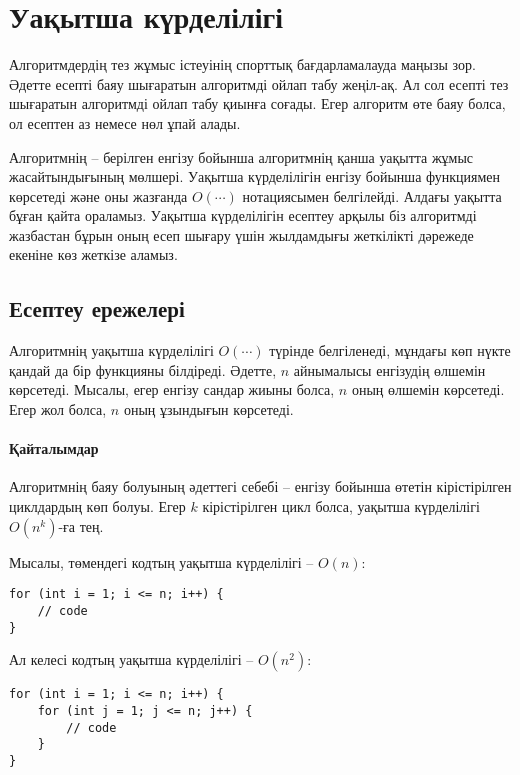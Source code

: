 \chapter{Уақытша күрделілігі}


Алгоритмдердің тез жұмыс істеуінің спорттық бағдарламалауда маңызы зор.
Әдетте есепті баяу шығаратын алгоритмді ойлап табу жеңіл-ақ.
Ал сол есепті тез шығаратын алгоритмді ойлап табу қиынға соғады.
Егер алгоритм өте баяу болса, ол есептен аз немесе нөл ұпай алады.

Алгоритмнің  -- берілген енгізу бойынша
алгоритмнің қанша уақытта жұмыс жасайтындығының мөлшері. 
Уақытша күрделілігін енгізу бойынша функциямен көрсетеді 
және оны жазғанда $O(\cdots)$ нотациясымен белгілейді. Алдағы уақытта бұған қайта ораламыз.
Уақытша күрделілігін есептеу арқылы біз алгоритмді жазбастан бұрын оның есеп шығару үшін
жылдамдығы жеткілікті дәрежеде екеніне көз жеткізе аламыз.

\section{Есептеу ережелері}

Алгоритмнің уақытша күрделілігі $O(\cdots)$ түрінде белгіленеді, мұндағы көп нүкте қандай да бір функцияны білдіреді.
Әдетте, $n$ айнымалысы енгізудің өлшемін көрсетеді.
Мысалы, егер енгізу сандар жиыны болса, 
$n$ оның өлшемін көрсетеді. Егер жол болса, 
$n$ оның ұзындығын көрсетеді.

\subsubsection{Қайталымдар}

Алгоритмнің баяу болуының әдеттегі себебі -- 
енгізу бойынша өтетін кірістірілген циклдардың көп болуы.
Егер $k$ кірістірілген цикл болса,
уақытша күрделілігі $O(n^k)$-ға тең. 

Мысалы, төмендегі кодтың уақытша күрделілігі -- $O(n)$:
\begin{lstlisting}
for (int i = 1; i <= n; i++) {
    // code
}
\end{lstlisting}

Ал келесі кодтың уақытша күрделілігі -- $O(n^2)$:
\begin{lstlisting}
for (int i = 1; i <= n; i++) {
    for (int j = 1; j <= n; j++) {
        // code
    }
}
\end{lstlisting}

